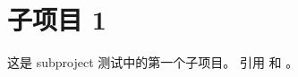 \documentclass{article}
\begin{document}
\section{子项目 1}

这是 subproject 测试中的第一个子项目。
引用 \cite{lamport1986latex} 和 \cite{knuth1986texbook}。



\end{document}
